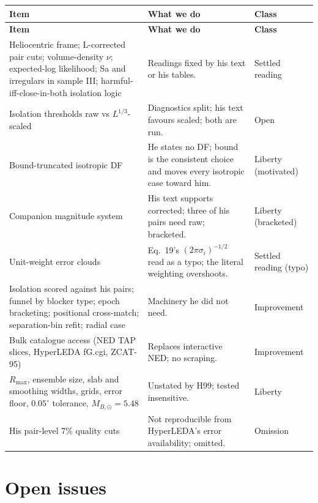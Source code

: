 \documentclass[11pt]{article}
\begin{document}
\begin{longtable}{p{} p{} p{}}
\toprule
\textbf{Item} & \textbf{What we do} & \textbf{Class} \\
\midrule
\endfirsthead
\toprule
\textbf{Item} & \textbf{What we do} & \textbf{Class} \\
\midrule
\endhead
\bottomrule
\endfoot
Heliocentric frame; L-corrected pair cuts; volume-density $\nu$; expected-log
likelihood; Sa and irregulars in sample III; harmful-iff-close-in-both
isolation logic & Readings fixed by his text or his tables. & Settled reading \\[4pt]
Isolation thresholds raw vs $L^{1/3}$-scaled & Diagnostics split; his text
favours scaled; both are run. & Open \\[4pt]
Bound-truncated isotropic DF & He states no DF; bound is the consistent
choice and moves every isotropic case toward him. & Liberty (motivated) \\[4pt]
Companion magnitude system & His text supports corrected; three of his pairs
need raw; bracketed. & Liberty (bracketed) \\[4pt]
Unit-weight error clouds & Eq.~19's $(2\pi\sigma_i)^{-1/2}$ read as a typo;
the literal weighting overshoots. & Settled reading (typo) \\[4pt]
Isolation scored against his pairs; funnel by blocker type; epoch bracketing;
positional cross-match; separation-bin refit; radial case & Machinery he did
not need. & Improvement \\[4pt]
Bulk catalogue access (NED TAP slices, HyperLEDA fG.cgi, ZCAT-95) &
Replaces interactive NED; no scraping. & Improvement \\[4pt]
$R_{\max}$, ensemble size, slab and smoothing widths, grids, error floor,
$0.05^\circ$ tolerance, $M_{B,\odot}=5.48$ & Unstated by H99; tested
insensitive. & Liberty \\[4pt]
His pair-level 7\% quality cuts & Not reproducible from HyperLEDA's error
availability; omitted. & Omission \\
\end{longtable}

\section{Open issues}
\label{sec:open}
\end{document}
